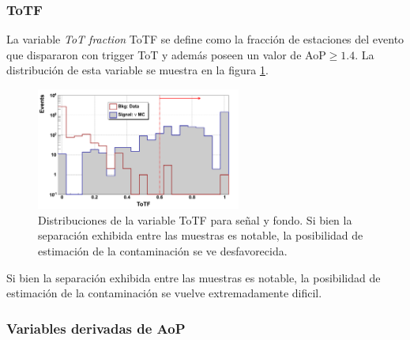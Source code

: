 	\subsubsection{ToTF}
	La variable \emph{ToT fraction} ToTF se define como la fracción de estaciones del evento que dispararon con trigger ToT y además poseen un valor de AoP$\geq1.4$.
	La distribución de esta variable se muestra en la figura \ref{fig:totfDist}.
	\begin{figure}[ht!]
		\begin{center}
		\includegraphics[width=0.6\textwidth]{fig/seleccionAuger/ToTF_forThesis}
		\caption{Distribuciones de la variable ToTF para señal y fondo. Si bien la separación exhibida entre las muestras es notable, la posibilidad de estimación de la contaminación se ve desfavorecida.}
		\label{fig:totfDist}
		\end{center}
	\end{figure}
	Si bien la separación exhibida entre las muestras es notable, la posibilidad de estimación de la contaminación se vuelve extremadamente dificil.
	
	\subsubsection{Variables derivadas de AoP}
	
